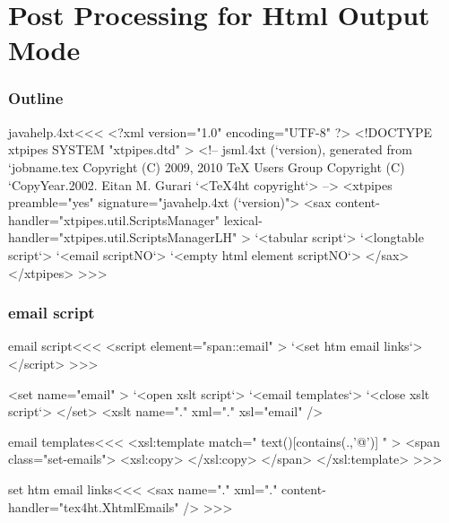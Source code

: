 \documentclass{article}
\begin{document}




\part{Post Processing for Html Output Mode}


\section{Outline}



\<javahelp.4xt\><<<
<?xml version="1.0" encoding="UTF-8" ?>
<!DOCTYPE xtpipes SYSTEM "xtpipes.dtd" >
<!-- jsml.4xt (`version), generated from `jobname.tex
     Copyright (C) 2009, 2010 TeX Users Group
     Copyright (C) `CopyYear.2002. Eitan M. Gurari
`<TeX4ht copyright`> -->
<xtpipes preamble="yes" signature="javahelp.4xt (`version)">
   <sax content-handler="xtpipes.util.ScriptsManager" 
        lexical-handler="xtpipes.util.ScriptsManagerLH" >
     `<tabular script`>
     `<longtable script`>
     `<email scriptNO`>
     `<empty html element scriptNO`>
   </sax>
</xtpipes>
>>>


\section{email script}

\<email script\><<<
<script element="span::email" >
   `<set htm email links`>
</script> 
>>>

   <set name="email" >
      `<open xslt script`>
      `<email templates`>
      `<close xslt script`>
   </set>
   <xslt name="." xml="." xsl="email" />


\<email templates\><<<
<xsl:template match=" text()[contains(.,'@')] " >
<span class="set-emails">
      <xsl:copy>
      </xsl:copy> 
</span>     
</xsl:template> 
>>>


\<set htm email links\><<<
<sax name="." xml="." content-handler="tex4ht.XhtmlEmails" />
>>>


 
\end{document}
